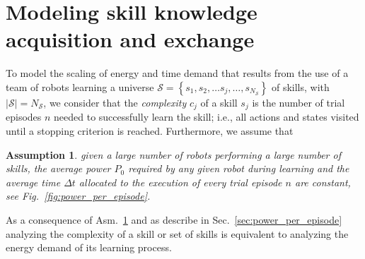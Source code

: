\documentclass[12pt]{article}
\renewcommand{\emph}[1]{\textit{#1}}
\newtheorem{assumption}{Assumption}
\begin{document}
\section*{Modeling skill knowledge acquisition and exchange}\label{sec:learning_paradigms}
To model the scaling of energy and time demand that results from the use of a team of robots learning a universe $\mathcal{S}=\left\lbrace s_1,s_2,\ldots s_j,\ldots, s_{N_\mathcal{S}}\right\rbrace$ of skills, with $|\mathcal{S}| = N_\mathcal{S}$, we consider that the \emph{complexity} $c_j$ of a skill $ s_j $  is the number of trial episodes $n$ needed to successfully learn the skill; i.e., all actions and states visited until a stopping criterion is reached. Furthermore, we assume that
\begin{tcolorbox}
	\begin{assumption}\label{assumption:time}
		given a large number of robots performing a large number of skills, the average power $P_0$ required by any given robot during learning and the average time $\Delta t$ allocated to the execution of every trial episode $n$ are constant, see Fig.~\ref{fig:power_per_episode}.
	\end{assumption}
\end{tcolorbox}
\noindent As a consequence of Asm.~\ref{assumption:time} and as describe in Sec.~\ref{sec:power_per_episode} analyzing the complexity of a skill or set of skills is equivalent to analyzing the energy demand of its learning process.

\end{document}

